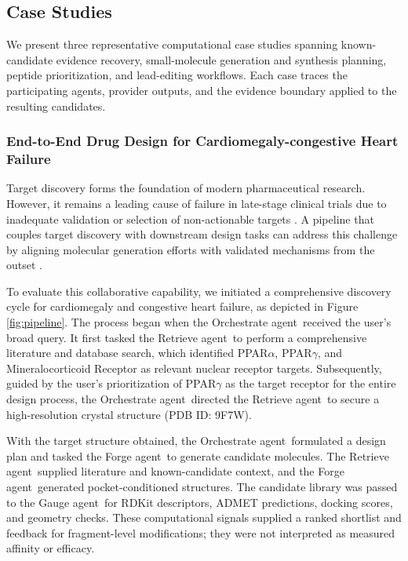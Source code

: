 \documentclass{article}
\newcommand{\oa}{Orchestrate agent}
\newcommand{\ra}{Retrieve agent}
\newcommand{\fa}{Forge agent}
\newcommand{\ga}{Gauge agent}
\begin{document}
\subsection*{Case Studies}

We present three representative computational case studies spanning known-candidate evidence recovery, small-molecule generation and synthesis planning, peptide prioritization, and lead-editing workflows. Each case traces the participating agents, provider outputs, and the evidence boundary applied to the resulting candidates.

\subsubsection*{End-to-End Drug Design for Cardiomegaly-congestive Heart Failure}
\label{case: 1}
Target discovery forms the foundation of modern pharmaceutical research. However, it remains a leading cause of failure in late-stage clinical trials due to inadequate validation or selection of non-actionable targets \cite{waring2015analysis, hughes2011principles}. A pipeline that couples target discovery with downstream design tasks can address this challenge by aligning molecular generation efforts with validated mechanisms from the outset \cite{mak2024artificial}.

To evaluate this collaborative capability, we initiated a comprehensive discovery cycle for cardiomegaly and congestive heart failure, as depicted in Figure \ref{fig:pipeline}. The process began when the \oa \ received the user's broad query. It first tasked the \ra \ to perform a comprehensive literature and database search, which identified PPAR$\alpha$, PPAR$\gamma$, and Mineralocorticoid Receptor as relevant nuclear receptor targets. Subsequently, guided by the user's prioritization of PPAR$\gamma$ as the target receptor  for the entire design process, the \oa \ directed the \ra \ to secure a high-resolution crystal structure (PDB ID: 9F7W).

With the target structure obtained, the \oa \ formulated a design plan and tasked the \fa \ to generate candidate molecules. The \ra \ supplied literature and known-candidate context, and the \fa \ generated pocket-conditioned structures. The candidate library was passed to the \ga \ for RDKit descriptors, ADMET predictions, docking scores, and geometry checks. These computational signals supplied a ranked shortlist and feedback for fragment-level modifications; they were not interpreted as measured affinity or efficacy.
\end{document}
